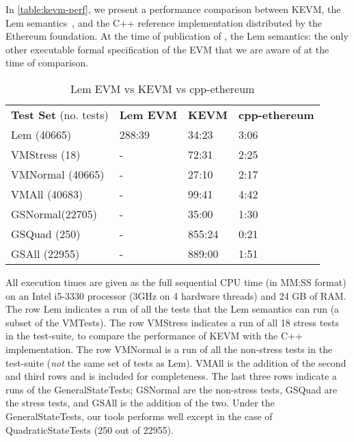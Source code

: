 In \autoref{table:kevm-perf}, we present a performance comparison between KEVM,
the Lem semantics~\cite{HiraiWSTC17},
and the C++ reference implementation distributed by the Ethereum foundation.
At the time of publication of \cite{HildenbrandtCSF18}, the Lem semantics:
the only other executable formal specification of the EVM that we are aware of
at the time of comparison.

\begin{table}[h]
    \centering
      \begin{tabular}{ l l l l }
          \textbf{Test Set} (no. tests) & \textbf{Lem EVM} & \textbf{KEVM} & \textbf{cpp-ethereum} \\
          Lem (40665)                   & 288:39           & 34:23         & 3:06                  \\
          VMStress (18)                 & -                & 72:31         & 2:25                  \\
          VMNormal (40665)              & -                & 27:10         & 2:17                  \\
          VMAll (40683)                 & -                & 99:41         & 4:42                  \\
          GSNormal(22705)               & -                & 35:00         & 1:30                  \\
          GSQuad (250)                  & -                & 855:24        & 0:21                  \\
          GSAll (22955)                 & -                & 889:00        & 1:51                  \\
      \end{tabular}
  \caption{Lem EVM vs KEVM vs cpp-ethereum} \label{table:kevm-perf}
\end{table}


All execution times are given as the full sequential CPU time (in MM:SS format)
  on an Intel i5-3330 processor (3GHz on 4 hardware threads) and 24 GB of RAM.
The row Lem indicates a run of all the tests that the Lem semantics
can run (a subset of the VMTests).
The row VMStress indicates a run of all 18 stress tests in the test-suite,
    to compare the performance of KEVM with the C++ implementation.
The row VMNormal is a run of all the non-stress
tests in the test-suite (\textit{not} the same set of tests as Lem).
VMAll is the addition of the second and third rows and is included for completeness.
The last three rows indicate a runs of the GeneralStateTests;
GSNormal are the non-stress tests, GSQuad are the stress tests,
         and GSAll is the addition of the two.
Under the GeneralStateTests, our tools performs well except
in the case of QuadraticStateTests (250 out of 22955).


